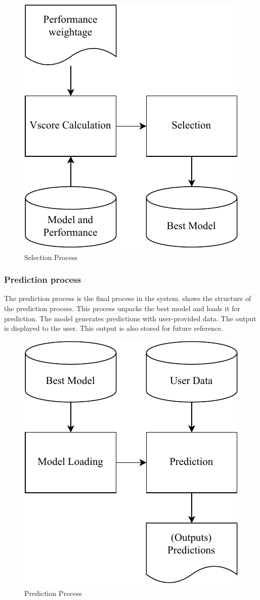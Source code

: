 \documentclass[a4paper,fleqn]{cas-dc}
\begin{document}
\begin{figure}[ht]
    \centering
    \includegraphics[width=0.7\columnwidth]{selection.pdf}
    \caption{Selection Process}
    \label{fig:selection_process}
\end{figure}

\subsubsection{Prediction process}\label{subsubsec:prediction_process}

The prediction process is the final process in the system.  shows the structure of the prediction process. This process unpacks the best model and loads it for prediction. The model generates predictions with user-provided data. The output is displayed to the user. This output is also stored for future reference.

\begin{figure}[ht]
    \centering
    \includegraphics[width=0.7\columnwidth]{prediction.pdf}
    \caption{Prediction Process}
    \label{fig:prediction_process}
\end{figure}
\end{document}
